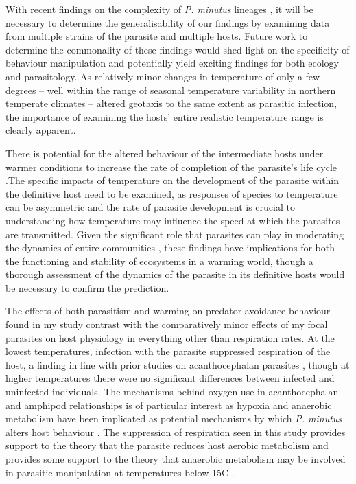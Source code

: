 With recent findings on the complexity of \emph{P. minutus} lineages \citep{zittel2018}, it will be necessary to determine the generalisability of our findings by examining data from multiple strains of the parasite and multiple hosts. Future work to determine the commonality of these findings would shed light on the specificity of behaviour manipulation and potentially yield exciting findings for both ecology and parasitology. As relatively minor changes in temperature of only a few degrees – well within the range of seasonal temperature variability in northern temperate climates – altered geotaxis to the same extent as parasitic infection, the importance of examining the hosts’ entire realistic temperature range is clearly apparent. 

There is potential for the altered behaviour of the intermediate hosts under warmer conditions to increase the rate of completion of the parasite’s life cycle \citep{tierney1993, strepparava2017}.The specific impacts of temperature on the development of the parasite within the definitive host need to be examined, as responses of species to temperature can be asymmetric \citep{dell2014, goedknegt2015} and the rate of parasite development is crucial to understanding how temperature may influence the speed at which the parasites are transmitted. Given the significant role that parasites can play in moderating the dynamics of entire communities \citep{dunne2013}, these findings have implications for both the functioning and stability of ecosystems in a warming world, though a thorough assessment of the dynamics of the parasite in its definitive hosts would be necessary to confirm the prediction.

The effects of both parasitism and warming on predator-avoidance behaviour found in my study contrast with the comparatively minor effects of my focal parasites on host physiology in everything other than respiration rates. At the lowest temperatures, infection with the parasite suppressed respiration of the host, a finding in line with prior studies on acanthocephalan parasites \citep{rumpus1974}, though at higher temperatures there were no significant differences between infected and uninfected individuals. The mechanisms behind oxygen use in acanthocephalan and amphipod relationships is of  particular interest as hypoxia and anaerobic metabolism have been implicated as potential mechanisms by which \emph{P. minutus} alters host behaviour \citep{perrot2016}. The suppression of respiration seen in this study provides support to the theory that the parasite reduces host aerobic metabolism and provides some support to the theory that anaerobic metabolism may be involved in parasitic manipulation at temperatures below 15\degree C . 

